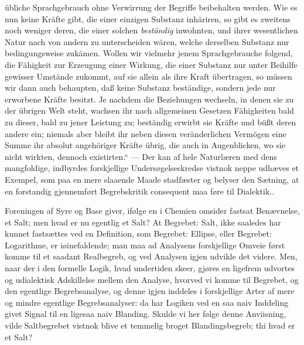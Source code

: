 \documentclass[12pt,a4paper]{book}
\begin{document}
{übliche Sprachgebrauch ohne Verwirrung der Begriffe beibehalten
werden. Wie es nun keine Kräfte gibt, die einer einzigen Substanz
inhäriren, so gibt es zweitens noch weniger deren, die einer
solchen \emph{beständig} inwohnten, und ihrer wesentlichen Natur nach
von andern zu unterscheiden wären, welche derselben Substanz
nur bedingungsweise zukämen. Wollen wir vielmehr jenem
Sprachgebrauche folgend, die
Fähigkeit zur Erzeugung einer Wirkung,
die einer Substanz nur unter Beihilfe gewisser Umstände zukommt,
auf sie allein als ihre Kraft übertragen, so müssen wir dann
auch behaupten, daß keine Substanz beständige, sondern jede nur
erworbene Kräfte besitzt. Je nachdem die Beziehungen wechseln,
in denen sie zu der übrigen Welt steht, wachsen ihr nach
allgemeinen Gesetzen Fähigkeiten bald zu dieser, bald zu jener
Leistung zu; beständig erwirbt sie Kräfte und büßt deren andere
ein; niemals aber bleibt ihr neben diesen veränderlichen Vermögen
eine Summe ihr absolut angehöriger Kräfte übrig, die auch in
Augenblicken, wo sie nicht wirkten, dennoch existirten.“ --- Der
kan af hele Naturlæren med dens mangfoldige, indbyrdes forskjellige
Undersøgelseskredse vistnok neppe udhæves et Exempel,
som paa en mere slaaende Maade stadfæster og belyser den Sætning,
at en forstandig gjennemført Begrebskritik consequent maa
føre til Dialektik.}.

Foreningen af Syre og Base giver, ifølge en i Chemien
omsider fastsat Benævnelse, et Salt; men hvad er nu
egentlig et Salt? At Begrebet: Salt, ikke saaledes har kunnet
fastsættes ved en Definition, som Begrebet: Ellipse, eller Begrebet:
Logarithme, er iøinefaldende; man maa ad Analysens
forskjellige Omveie først komme til et saadant Realbegreb, og
ved Analysen igjen udvikle det videre. Men, naar der i den
formelle Logik, hvad undertiden skeer, gjøres en ligefrem udvortes
og udialektisk Adskillelse mellem den Analyse, hvorved
vi komme til Begrebet, og den egentlige Begrebsanalyse, og
denne igjen inddeles i forskjellige Arter af mere og mindre
egentlige Begrebsanalyser: da har Logiken ved en saa naiv
Inddeling givet Signal til en ligesaa naiv Blanding. Skulde
vi her følge denne Anviisning, vilde Saltbegrebet vistnok blive
et temmelig broget Blandingsbegreb; thi hvad er et Salt?
\end{document}
